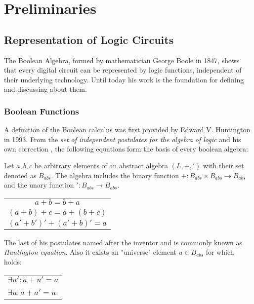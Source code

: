 \chapter{Preliminaries}\label{chapter:Preliminaries}

\section{Representation of Logic Circuits}
The Boolean Algebra, formed by mathematician George Boole in 1847, shows that every digital circuit can be represented by logic functions, independent of their underlying technology. Until today his work is the foundation for defining and discussing about them.

\subsection{Boolean Functions}\label{subsec:boolfunc}
A definition of the Boolean calculus was first provided by Edward V. Huntington in 1993. From the \textit{set of independent postulates for the algebra of logic} and his own correction \cite{HuntingtonPostulate, HuntingtonCorrection}, the following equations form the basis of every boolean algebra:

\begin{definition}\label{Def:BasBool}
Let $a, b, c$ be arbitrary elements of an abstract algebra $(L, +, ')$ with their set denoted as $B_{abs}$. The algebra includes the binary function $+ : B_{abs} \times B_{abs} \rightarrow B_{abs}$ and the unary function $' : B_{abs} \rightarrow B_{abs}$.
\begin{table}[h]
	\centering
	\begin{tabular}{c}
		$a + b = b + a$ \\
		$(a + b) + c =  a + (b + c)$\\
		$(a' + b')' + (a' + b)' = a$\\
	\end{tabular}
\end{table}

The last of his postulates named after the inventor and is commonly known as \textit{Huntington equation}. Also it exists an "universe" element $u \in B_{abs}$ for which holds:

\begin{table}[h]
	\centering
	\begin{tabular}{l}
		$\exists u' : a + u' = a$ \\
		$\exists u : a + a' = u$. \\
	\end{tabular}
\end{table}

\end{definition}

